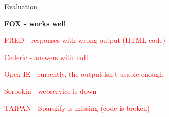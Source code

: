\begin{frame}{Evaluation}
	\begin{itemize}
		\item \textbf{FOX - works well}
		\textcolor{red}{
		\item FRED - responses with wrong output (HTML code)
		\item Cederic - answers with null
		\item Open-IE - currently, the output isn't usable enough
		\item Sorookin - webservice is down
		\item TAIPAN - Sparqlify is missing (code is broken)
		}
	\end{itemize}

\end{frame}